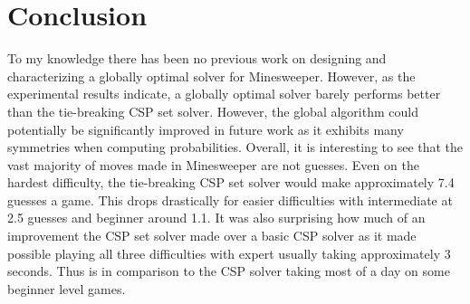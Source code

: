 \documentclass[letterpaper]{article}
\begin{document}
\section{Conclusion}
To my knowledge there has been no previous work on designing and characterizing a globally optimal solver for Minesweeper.  However, as the experimental results indicate, a globally optimal solver barely performs better than the tie-breaking CSP set solver.  However, the global algorithm could potentially be significantly improved in future work as it exhibits many symmetries when computing probabilities.  Overall, it is interesting to see that the vast majority of moves made in Minesweeper are not guesses.  Even on the hardest difficulty, the tie-breaking CSP set solver would make approximately 7.4 guesses a game.  This drops drastically for easier difficulties with intermediate at 2.5 guesses and beginner around 1.1.  It was also surprising how much of an improvement the CSP set solver made over a basic CSP solver as it made possible playing all three difficulties with expert usually taking approximately 3 seconds.  Thus is in comparison to the CSP solver taking most of a day on some beginner level games.



\nocite{*}
\end{document}
